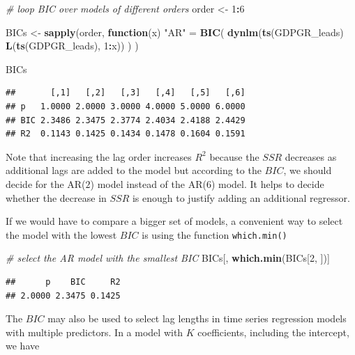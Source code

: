 \documentclass[]{book}
\newenvironment{Shaded}{\begin{snugshade}}{\end{snugshade}}
\newcommand{\KeywordTok}[1]{\textcolor[rgb]{0.13,0.29,0.53}{\textbf{#1}}}
\newcommand{\DecValTok}[1]{\textcolor[rgb]{0.00,0.00,0.81}{#1}}
\newcommand{\StringTok}[1]{\textcolor[rgb]{0.31,0.60,0.02}{#1}}
\newcommand{\CommentTok}[1]{\textcolor[rgb]{0.56,0.35,0.01}{\textit{#1}}}
\newcommand{\ControlFlowTok}[1]{\textcolor[rgb]{0.13,0.29,0.53}{\textbf{#1}}}
\newcommand{\OperatorTok}[1]{\textcolor[rgb]{0.81,0.36,0.00}{\textbf{#1}}}
\newcommand{\NormalTok}[1]{#1}
\theoremstyle{definition}
\theoremstyle{definition}
\theoremstyle{definition}
\theoremstyle{remark}
\begin{document}
\begin{Shaded}
\begin{Highlighting}[]
\CommentTok{# loop BIC over models of different orders}
\NormalTok{order <-}\StringTok{ }\DecValTok{1}\OperatorTok{:}\DecValTok{6}

\NormalTok{BICs <-}\StringTok{ }\KeywordTok{sapply}\NormalTok{(order, }
       \ControlFlowTok{function}\NormalTok{(x) }
        \StringTok{"AR"}\NormalTok{ =}\StringTok{ }\KeywordTok{BIC}\NormalTok{(}
          \KeywordTok{dynlm}\NormalTok{(}\KeywordTok{ts}\NormalTok{(GDPGR_leads) }\OperatorTok{~}\StringTok{ }\KeywordTok{L}\NormalTok{(}\KeywordTok{ts}\NormalTok{(GDPGR_leads), }\DecValTok{1}\OperatorTok{:}\NormalTok{x))}
\NormalTok{          )}
\NormalTok{       )}

\NormalTok{BICs}
\end{Highlighting}
\end{Shaded}

\begin{verbatim}
##       [,1]   [,2]   [,3]   [,4]   [,5]   [,6]
## p   1.0000 2.0000 3.0000 4.0000 5.0000 6.0000
## BIC 2.3486 2.3475 2.3774 2.4034 2.4188 2.4429
## R2  0.1143 0.1425 0.1434 0.1478 0.1604 0.1591
\end{verbatim}

Note that increasing the lag order increases \(R^2\) because the \(SSR\)
decreases as additional lags are added to the model but according to the
\(BIC\), we should decide for the AR(\(2\)) model instead of the
AR(\(6\)) model. It helps to decide whether the decrease in \(SSR\) is
enough to justify adding an additional regressor.

If we would have to compare a bigger set of models, a convenient way to
select the model with the lowest \(BIC\) is using the function
\texttt{which.min()}

\begin{Shaded}
\begin{Highlighting}[]
\CommentTok{# select the AR model with the smallest BIC}
\NormalTok{BICs[, }\KeywordTok{which.min}\NormalTok{(BICs[}\DecValTok{2}\NormalTok{, ])]}
\end{Highlighting}
\end{Shaded}

\begin{verbatim}
##      p    BIC     R2 
## 2.0000 2.3475 0.1425
\end{verbatim}

The \(BIC\) may also be used to select lag lengths in time series
regression models with multiple predictors. In a model with \(K\)
coefficients, including the intercept, we have
\end{document}
